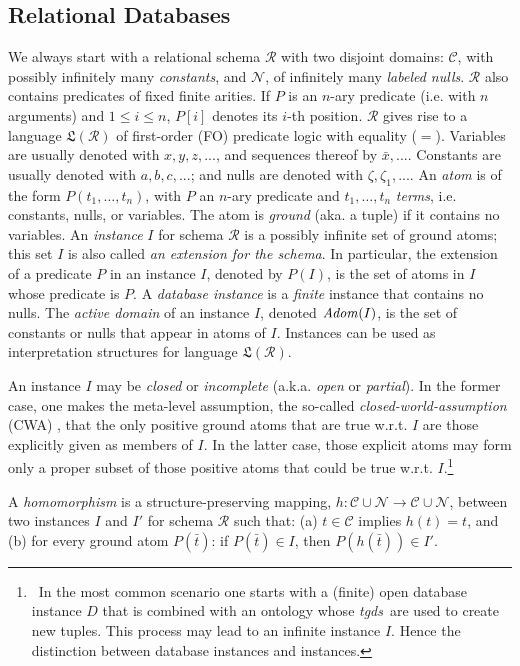 \documentclass[format=acmsmall, review=false, screen=true]{acmart}
\newcommand{\mc}[1]{\mathcal{ #1}}
\newcommand{\mf}[1]{\mathfrak{ #1}}
\newcommand{\schema}{\mc{R}}
\newcommand{\vectt}[1]{\bar{#1}}
\newcommand{\tgds}{{\em tgds}}
\newcommand{\red}[1]{{#1}}
\begin{document}
\subsection{Relational Databases}\label{sec:relational}

We always start with a  relational schema $\schema$ with two disjoint domains:  $\mc{C}$, with possibly infinitely many {\em constants}, and $\mc{N}$, of infinitely many {\em labeled nulls}. $\schema$ also contains predicates of fixed finite arities. If $P$ is an $n$-ary predicate (i.e. with $n$ arguments) and $1\leq i \leq n$, $P[i]$ denotes its $i$-th position. $\schema$ gives rise to a language $\mf{L}(\schema)$ of first-order (FO)  predicate logic with equality ($=$).  Variables are usually denoted with $x, y, z, ...$, and sequences thereof by $\bar{x}, ...$. Constants are usually denoted with $a, b, c, ...$; and nulls are denoted with $\zeta, \zeta_1, ...$. An {\em atom} is of the form $P(t_1, \ldots, t_n)$, with $P$ an $n$-ary predicate  and $t_1, \ldots, t_n$ {\em terms}, i.e. constants, nulls, or variables. The atom is {\em ground} (aka. a tuple) if it contains no variables. An {\em instance} $I$ for schema $\mc{R}$ is a possibly infinite set of ground atoms; \red{this set $I$ is also called {\em an extension for the schema}. In particular, the extension of a predicate $P$ in an instance $I$, denoted by $P(I)$, is the set of atoms in $I$ whose predicate is $P$.} A {\em database instance} is a {\em finite} instance that contains no  nulls. The {\em active domain} of an  instance $I$, denoted ${\it Adom}(I)$, is the set of \red{constants or nulls} that appear in atoms of $I$. Instances can be used as interpretation structures for language $\mf{L}(\schema)$.

\red{An instance $I$ may be {\em closed} or {\em incomplete} (a.k.a. {\em open} or {\em partial}). In the former case, one makes the meta-level assumption, the so-called {\em closed-world-assumption} (CWA) \cite{reiter,abiteboul}, that the only positive ground atoms that are true w.r.t. $I$ are those explicitly given as members of $I$. In the latter case, those explicit atoms may form only a proper subset of those positive atoms that could be true w.r.t. $I$.}\footnote{\ \red{In the most common scenario one starts with a (finite) open database instance $D$ that is combined with an ontology whose \tgds \ are used to create new tuples. This process may lead to an infinite instance $I$. Hence the distinction between database instances and instances.}}

 A {\em homomorphism} is a structure-preserving mapping, $h\!\!:\mc{C}\cup\mc{N} \!\rightarrow \!\mc{C}\cup\mc{N}$,  between two instances $I$ and $I'$ for  schema $\mc{R}$ such that: (a) $t \in \mc{C}$ implies $h(t)=t$, and (b) for every ground atom $P(\vectt{t})$: if $P(\vectt{t}) \in I$, then $P(h(\vectt{t})) \in I'$. %
\end{document}
